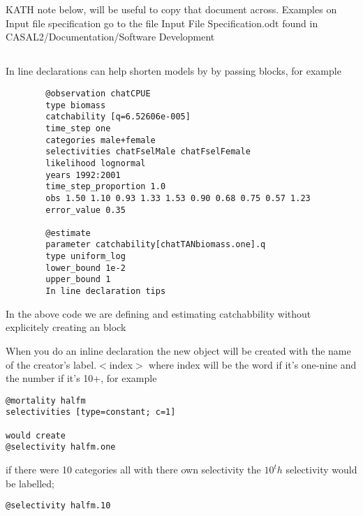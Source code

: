 
\section{\label{sec:examples}}

\subsection{\label{example1}}



KATH note below, will be useful to copy that document across.
Examples on Input file specification go to the file Input File Specification.odt found in CASAL2/Documentation/Software Development




\subsection{\label{sec:declare}}

In line declarations can help shorten models by by passing \command{} blocks, for example 
{\small{\begin{verbatim}
		@observation chatCPUE
		type biomass
		catchability [q=6.52606e-005]
		time_step one
		categories male+female
		selectivities chatFselMale chatFselFemale
		likelihood lognormal
		years 1992:2001
		time_step_proportion 1.0
		obs 1.50 1.10 0.93 1.33 1.53 0.90 0.68 0.75 0.57 1.23
		error_value 0.35
		
		@estimate 
		parameter catchability[chatTANbiomass.one].q
		type uniform_log
		lower_bound 1e-2
		upper_bound 1
		In line declaration tips
		\end{verbatim}}}

In the above code we are defining and estimating catchabbility without explicitely creating an  block


When you do an inline declaration the new object will be created with the name of the creator's label.$<$index$>$
where index will be the word if it's one-nine and the number if it's 10+, for example
{\small{\begin{verbatim}
@mortality halfm
selectivities [type=constant; c=1]

would create
@selectivity halfm.one
		\end{verbatim}}}

if there were 10 categories all with there own selectivity the $10^th$ selectivity would be labelled;

{\small{\begin{verbatim}
@selectivity halfm.10
\end{verbatim}}}